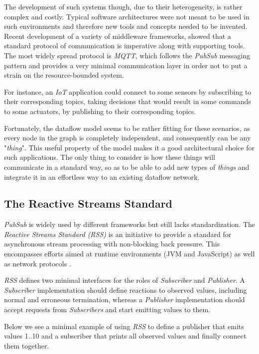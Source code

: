 \documentclass[sigplan,review,anonymous]{acmart}\settopmatter{printfolios=true,printacmref=false}
\begin{document}
The development of such systems though, due to their heterogeneity, is rather complex and costly. Typical software architectures were not meant to be used in such environments and therefore new tools and concepts needed to be invented. Recent development of a variety of middleware frameworks, showed that a standard protocol of communication is imperative along with supporting tools\cite{iot_middleware}. The most widely spread protocol is \textit{MQTT}, which follows the \textit{PubSub} messaging pattern and provides a very minimal communication layer in order not to put a strain on the resource-bounded system\cite{mqtt}.

For instance, an \textit{IoT} application could connect to some sensors by subscribing to their corresponding topics, taking decisions that would result in some commands to some actuators, by publishing to their corresponding topics.

Fortunately, the dataflow model seems to be rather fitting for these scenarios\cite{iot_dataflow}, as every node in the graph is completely independent, and consequently can be any "\textit{thing}". This useful property of the model makes it a good architectural choice for such applications. The only thing to consider is how these things will communicate in a standard way, so as to be able to add new types of \textit{things} and integrate it in an effortless way to an existing dataflow network.

\subsection{The Reactive Streams Standard}

\textit{PubSub} is widely used by different frameworks but still lacks standardization. The \textit{Reactive Streams Standard (RSS)} is an initiative to provide a standard for asynchronous stream processing with non-blocking back pressure. This encompasses efforts aimed at runtime environments (JVM and JavaScript) as well as network protocols \cite{rss}.

\textit{RSS} defines two minimal interfaces for the roles of \textit{Subscriber} and \textit{Publisher}. A \textit{Subscriber} implementation should define reactions to observed values, including normal and erroneous termination, whereas a \textit{Publisher} implementation should accept requests from \textit{Subscribers} and start emitting values to them.

Below we see a minimal example of using \textit{RSS} to define a publisher that emits values 1..10 and a subscriber that prints all observed values and finally connect them together.
\end{document}

